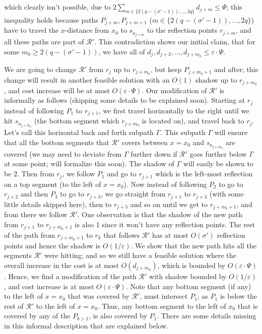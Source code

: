 \documentclass[pdflatex,sn-mathphys-num]{sn-jnl}
\theoremstyle{thmstyleone}
\newcommand{\eps}{\varepsilon}
\begin{document}
    which clearly isn't possible, due to $2\sum_{m\in\{2(q-(\sigma'-1)),\ldots,2q\}} d_{j+m}\leq\Psi$; this inequality holds because paths $P_{j+m},P_{j+m+1}$ ($m\in\{2(q-(\sigma'-1)),\ldots,2q\}$) have to travel the $x$-distance from $x_0$ to $s_{a_{j+m}}$ to the reflection points $r_{j+m}$, and all these paths are part of $\mathcal R'$. This contradiction shows our initial claim, that for some $m_0 \ge 2(q - (\sigma'-1))$, we have all of $d_{j},d_{j+2},\ldots,d_{j+m_0} \le \eps\cdot\Psi$.
        
        We are going to change $\mathcal R'$ from $r_{j}$ up to $r_{j + m_0}$, but keep $P_{j + m_0+1}$ and after; this change will result in another feasible solution with an $O(1)$ shadow up to $r_{j+m_0}$, and cost increase will be at most $O(\eps\cdot\Psi)$. 
        Our modification of $\mathcal R'$ is informally as follows (skipping some details to be explained soon). Starting at $r_j$ instead of following $P_1$ to $r_{j+1}$, we first travel horizontally to the right until we hit $s_{a_{j+m_0}}$ (the bottom segment which $r_{j+m_0}$ is located on), and travel back to $r_j$. Let's call this horizontal back and forth subpath $\Gamma$. 
	    This subpath $ \Gamma $ will ensure that all the bottom segments that $\mathcal R'$ covers between $x=x_0$ and $s_{a_{j+m_0}}$ are covered (we may need to deviate from $\Gamma$ further down if $\mathcal R'$ goes further below $\Gamma$ at some point; will formalize this soon). The shadow of $\Gamma$ will easily be shown to be 2.
	    Then from $r_j$, we follow $P_1$ and go to $r_{j+1}$ which is the left-most reflection on a top segment (to the left of $x=x_0$).
	    Now instead of following $P_2$ to go to $r_{j+2}$ and then $P_3$ to go to $r_{j+3}$, we go straight from $r_{j+1}$ to $r_{j+3}$ (with some little details skipped here), then to $r_{j+5}$ and so on until
	    we get to $r_{j+m_0+1}$, and from there we follow $\mathcal R'$. One observation is that the shadow of the new path from $r_{j+1}$ to $r_{j+m_0+1}$ is also 1 since it won't have any reflection points. 
	    The rest of the path from $r_{j+m_0+1}$ to $r_k$ that follows $\mathcal R'$ has at most $O(\sigma')$ reflection points and hence the shadow is $O(1/\eps)$.
	    We show that the new path hits all the segments $\mathcal R'$ were hitting; and so we still have a feasible solution where the overall increase in the cost is at most $O(d_{j+m_0})$, which is bounded by $O(\eps\cdot\Psi)$. Hence, we
	    find a modification of the path $\mathcal R'$ with shadow bounded by $O(1/\eps)$, and cost increase is at most $O(\eps\cdot\Psi)$.
		Note that any bottom segment (if any) to the left of $x=x_0$ that was covered by $\mathcal R'$, must intersect $P_1$;
        as $P_1$ is below the rest of $\mathcal R'$ to the left of $x=x_0$. 
        Thus, any bottom segment to the left of $x_0$ that is covered by any of the $P_{b>1}$, is also covered by $P_1$. There are some details missing in this informal description that are explained below.
	    
\end{document}

